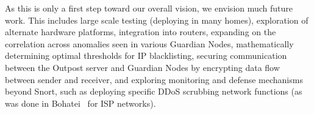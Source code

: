 As this is only a first step toward our overall vision, we envision much future work.
This includes large scale testing (deploying in many homes), exploration of alternate hardware platforms, integration into routers, expanding on the correlation across anomalies seen in various Guardian Nodes, mathematically determining optimal thresholds for IP blacklisting, securing communication between the Outpost server and Guardian Nodes by encrypting data flow between sender and receiver, and exploring 
monitoring and defense mechanisms beyond Snort, such as deploying specific DDoS scrubbing network functions (as was done in Bohatei~\cite{bohatei} for ISP networks).

%
%

